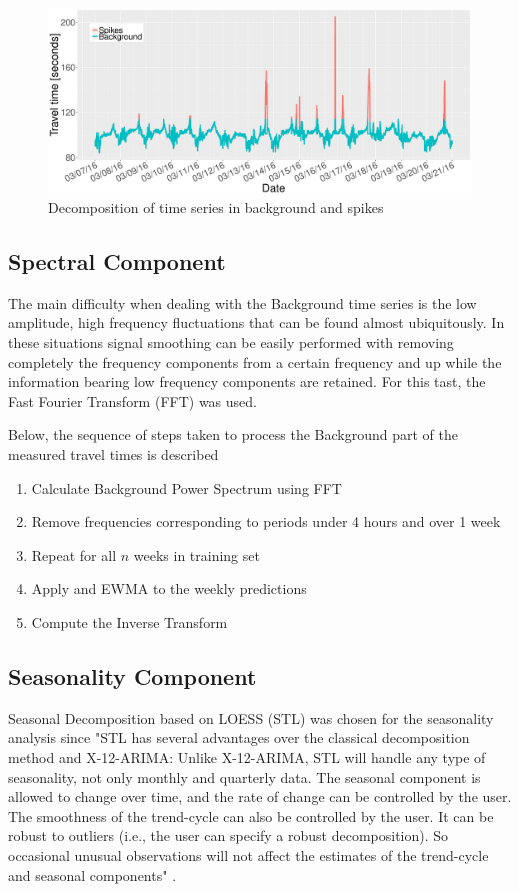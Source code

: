 \documentclass[conference]{IEEEtran}
\begin{document}
\begin{figure}[htbp]
	\centering
	\includegraphics[width=0.95\linewidth]{BS.pdf}
	\caption{ Decomposition of time series in background and spikes }
	\label{fig:Background}
\end{figure}



\subsection{Spectral Component}
The main difficulty when dealing with the Background time series is the low amplitude, high frequency fluctuations that can be found almost ubiquitously. 
In these situations signal smoothing can be easily performed with removing completely the frequency components from a certain frequency and up while the information bearing low frequency components are retained. 
For this tast, the Fast Fourier Transform (FFT) \cite{FFT} was used.

Below, the sequence of steps taken to process the Background part of the measured travel times is described
\begin{enumerate}

	\item Calculate Background Power Spectrum using FFT
	\item Remove frequencies corresponding to periods under 4 hours and over 1 week
	\item Repeat for all $n$ weeks in training set
    \item Apply and EWMA to the weekly predictions
	\item Compute the Inverse Transform

\end{enumerate}
\subsection{Seasonality Component}
Seasonal Decomposition based on LOESS (STL) \cite{STL} was chosen for the seasonality analysis since "STL has several advantages over the classical decomposition method and X-12-ARIMA: Unlike X-12-ARIMA, STL will handle any type of seasonality, not only monthly and quarterly data. 
The seasonal component is allowed to change over time, and the rate of change can be controlled by the user. 
The smoothness of the trend-cycle can also be controlled by the user. It can be robust to outliers (i.e., the user can specify a robust decomposition). 
So occasional unusual observations will not affect the estimates of the trend-cycle and seasonal components" \cite{forecasting}.\\
\end{document}
